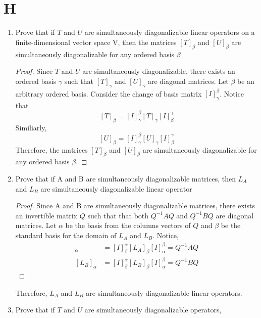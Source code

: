 \documentclass[11pt]{scrartcl}
\begin{document}
\section{H}
\begin{enumerate}[label=\alph*.]
	\item{
	      Prove that if $T$ and $U$ are simultaneously diagonalizable linear operators on a finite-dimensional vector
	      space V, then the matrices $[T]_\beta$ and $[U]_\beta$ are simultaneously diagonalizable for any ordered basis $\beta$
	      \begin{proof}
		      Since $T$ and $U$ are simultaneously diagonalizable, there exists an ordered basis $\gamma$ such that $[T]_\gamma$ and $[U]_\gamma$ are diagonal matrices.
		      Let $\beta$ be an arbitrary ordered basis.
		      Consider the change of basis matrix $[I]_\gamma^\beta$.
		      Notice that
		      \[
			      [T]_\beta = [I]_\gamma^\beta [T]_\gamma [I]_\beta^\gamma
		      \]
		      Similiarly,
		      \[
			      [U]_\beta = [I]_\gamma^\beta [U]_\gamma [I]_\beta^\gamma
		      \]
		      Therefore, the matrices $[T]_\beta$ and $[U]_\beta$ are simultaneously diagonalizable for any ordered basis $\beta$.
	      \end{proof}
	      }
	\item{
	      Prove that if A and B are simultaneously diagonalizable matrices, then $L_A$ and $L_B$ are simultaneously
	      diagonalizable linear operator
	      \begin{proof}
		      Since A and B are simultaneously diagonalizable matrices, there exists
		      an invertible matrix $Q$ such that that both $Q^{-1}AQ$ and $Q^{-1}BQ$
		      are diagonal matrices. Let $\alpha$ be the basis from the columns vectors of
		      $Q$ and $\beta$ be the standard basis for the domain of $L_A$ and $L_B$.
		      Notice,
		      \begin{align*}
			      [L_A]_\alpha & = [I]_\beta^\alpha [L_A]_\beta [I]_\alpha^\beta = Q^{-1}AQ \\
			      [L_B]_\alpha & = [I]_\beta^\alpha [L_B]_\beta [I]_\alpha^\beta = Q^{-1}BQ
		      \end{align*}
	      \end{proof}
	      Therefore, $L_A$ and $L_B$ are simultaneously
	      diagonalizable linear operators.
	      }
	\item{
	      Prove that if $T$ and $U$ are simultaneously diagonalizable operators,
}
\end{enumerate}
\end{document}
